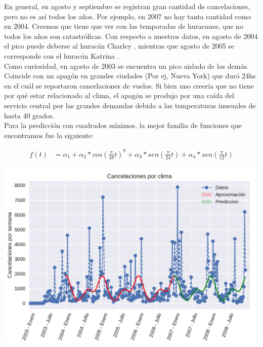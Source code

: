 En general, en agosto y septiembre se registran gran cantidad de cancelaciones, pero no es así todos los años. Por ejemplo, en 2007 no hay tanta cantidad como en 2004. Creemos que tiene que ver con las temporadas de huracanes, que no todos los años son catastróficas. Con respecto a nuestros datos, en agosto de 2004 el pico puede deberse al huracán Charley \cite{HuracanCharley}, mientras que agosto de 2005 se corresponde con el huracán Katrina \cite{HuracanKatrina}. \\

Como curiosidad, en agosto de 2003 se encuentra un pico aislado de los demás. Coincide con un apagón en grandes ciudades (Por ej, Nueva York) que duró 24hs en el cuál se reportaron cancelaciones de vuelos. Si bien uno creería que no tiene por qué estar relacionado al clima, el apagón se produjo por una caída del servicio central por las grandes demandas debido a las temperaturas inusuales de hasta 40 grados. \cite{ApagonNewYork} \\

Para la predicción con cuadrados mínimos, la mejor familia de funciones que encontramos fue la siguiente:

\begin{align}
f(t) &= \alpha_1 + \alpha_2 * cos(\frac{\pi}{48} t)^{8} + \alpha_3 * sen(\frac{\pi}{24} t) + \alpha_4 * sen(\frac{\pi}{12} t)
\end{align}

{\centering
    \includegraphics[scale=0.8]{informe/imagenes/cancelacionesPorClimaGeneralPrediccionV1.pdf} \\
}

